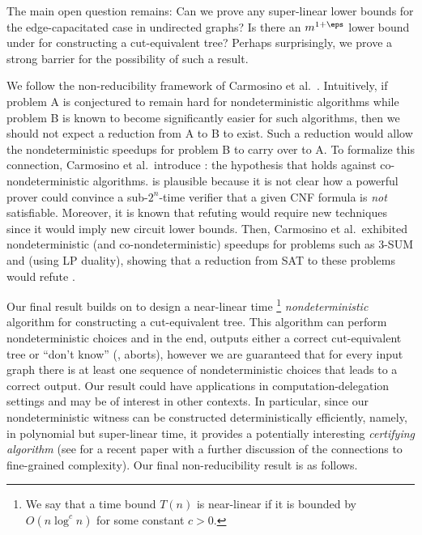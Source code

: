 %



\medskip

The main open question remains: Can we prove any super-linear lower bounds for the edge-capacitated case in undirected graphs? Is there an $m^{1+\eps}$ lower bound under \SETH for constructing a cut-equivalent tree?
Perhaps surprisingly, we prove a strong barrier for the possibility of such a result.

We follow the non-reducibility framework of Carmosino et al.~\cite{carmosino2016nondeterministic}.
Intuitively, if problem A is conjectured to remain hard for nondeterministic algorithms while problem B is known to become significantly easier for such algorithms, then we should not expect a reduction from A to B to exist. Such a reduction would allow the nondeterministic speedups for problem B to carry over to A.
To formalize this connection, Carmosino et al.\ introduce \NSETH: the hypothesis that \SETH holds against co-nondeterministic algorithms.
\NSETH is plausible because it is not clear how a powerful prover could convince a sub-$2^{n}$-time verifier that a given CNF formula is \emph{not} satisfiable.
Moreover, it is known that refuting \NSETH
%
would require  %
new techniques since it
%
would imply  %
new circuit lower bounds.
Then, Carmosino et al.\ exhibited nondeterministic (and co-nondeterministic) speedups for problems such as $3$-SUM and \MF (using LP duality), showing that a reduction from SAT to these problems would refute \NSETH.

Our final result builds on  to design
a near-linear time%
\footnote{We say that a time bound $T(n)$ is near-linear
  if it is bounded by $O(n\log^c n)$ for some constant $c>0$.
}
\emph{nondeterministic} algorithm for constructing a cut-equivalent tree.
This algorithm can perform nondeterministic choices and in the end,
outputs either a correct cut-equivalent tree or ``don't know'' (\ie, aborts),
however we are guaranteed that for every input graph there is at least one sequence of nondeterministic choices that leads to a correct output.
Our result could have applications in computation-delegation settings and may be of interest in other contexts.
In particular, since our nondeterministic witness can be constructed deterministically efficiently, namely, in polynomial but super-linear time,
it provides a potentially interesting \emph{certifying algorithm} \cite{certify_survey11,alkassar2011verification} (see \cite{Kunnemann18} for a recent paper with a further discussion of the connections to fine-grained complexity).
Our final non-reducibility result is as follows.

